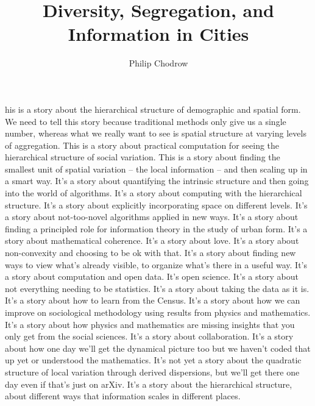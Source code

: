 \documentclass[9pt,twocolumn,twoside]{pnas-new}
\title{Diversity, Segregation, and Information in Cities}
\author[a,b,1]{Philip Chodrow}
\affil[a]{Human Mobility and Networks Laboratory, Massachusetts Institute of Technology, Cambridge, MA 02139}
\affil[b]{Operations Research Center, Massachusetts Institute of Technology, Cambridge, MA 02139}
\begin{document}
\verticaladjustment{-2pt}

\maketitle
\thispagestyle{firststyle}

his is a story about the hierarchical structure of demographic and spatial form. We need to tell this story because traditional methods only give us a single number, whereas what we really want to see is spatial structure at varying levels of aggregation. This is a story about practical computation for seeing the hierarchical structure of social variation. This is a story about finding the smallest unit of spatial variation -- the local information -- and then scaling up in a smart way. It's a story about quantifying the intrinsic structure and then going into the world of algorithms. It's a story about computing with the hierarchical structure. It's a story about explicitly incorporating space on different levels. It's a story about not-too-novel algorithms applied in new ways. It's a story about finding a principled role for information theory in the study of urban form. It's a story about mathematical coherence. It's a story about love. It's a story about non-convexity and choosing to be ok with that. It's a story about finding new ways to view what's already visible, to organize what's there in a useful way. It's a story about computation and open data. It's open science. It's a story about not everything needing to be statistics. It's a story about taking the data as it is. It's a story about how to learn from the Census. It's a story about how we can improve on sociological methodology using results from physics and mathematics. It's a story about how physics and mathematics are missing insights that you only get from the social sciences. It's a story about collaboration. It's a story about how one day we'll get the dynamical picture too but we haven't coded that up yet or understood the mathematics. It's not yet a story about the quadratic structure of local variation through derived dispersions, but we'll get there one day even if that's just on arXiv. It's a story about the hierarchical structure, about different ways that information scales in different places. 
\end{document}
